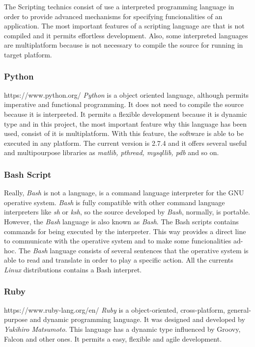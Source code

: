 The Scripting technics consist of use a interpreted programming language in
order to provide advanced mechanisms for specifying funcionalities of an
application. The most important features of a scripting language are that is not
compiled and it permits effortless development. Also, some interpreted languages
are multiplatform because is not necessary to compile the source for running in
target platform. 


\subsubsection{Python}
https://www.python.org/
\emph{Python} is a object oriented language, although permits imperative and functional
programming. It does not need to compile the source because it is
interpreted. It permits a flexible development because it is dynamic type and in
this project, the most important feature why this language has been used,
consist of it is multiplatform. With this feature, the software is able to be
executed in any platform. The current version is 2.7.4 and it offers several
useful and multipourpose libraries as \emph{matlib, pthread, mysqllib, pdb} and so on.

\subsubsection{Bash Script}

Really, \emph{Bash} is not a language, is a command language interpreter for the GNU
operative system. \emph{Bash} is fully compatible with other command language
interpreters like \emph{sh} or \emph{ksh}, so the source developed by \emph{Bash}, normally, is
portable. 
However, the \emph{Bash} language is also known as \emph{Bash}. The Bash scripts contains
commands for being executed by the interpreter. This way provides a direct line
to communicate with the operative system and to make some funcionalities ad-hoc.
The \emph{Bash} language consists of several sentences that the operative system is
able to read and translate in order to play a specific action. All the currents
\emph{Linux} distributions contains a Bash interpret. 

\subsubsection{Ruby}
https://www.ruby-lang.org/en/
\emph{Ruby} is a object-oriented, cross-platform, general-purpose and dynamic
programming language. It was designed and developed by \emph{Yukihiro
  Matsumoto}. This language has a dynamic type influenced by Groovy, Falcon and
other ones. It permits a easy, flexible and agile development. 


